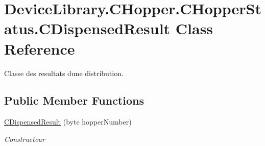 \hypertarget{class_device_library_1_1_c_hopper_1_1_c_hopper_status_1_1_c_dispensed_result}{}\section{Device\+Library.\+C\+Hopper.\+C\+Hopper\+Status.\+C\+Dispensed\+Result Class Reference}
\label{class_device_library_1_1_c_hopper_1_1_c_hopper_status_1_1_c_dispensed_result}


Classe des resultats d\textquotesingle{}une distribution.  


\subsection*{Public Member Functions}
\begin{DoxyCompactItemize}
\item 
\mbox{\hyperlink{class_device_library_1_1_c_hopper_1_1_c_hopper_status_1_1_c_dispensed_result_afe0fb651efeaf2009052a6f45f64dbbe}{C\+Dispensed\+Result}} (byte hopper\+Number)
\begin{DoxyCompactList}\small\item\em Constructeur \end{DoxyCompactList}\end{DoxyCompactItemize}
